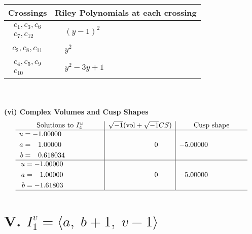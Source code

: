 \documentclass[1p]{elsarticle_modified}
\theoremstyle{definition}
\newcommand{\I}{\sqrt{-1}}
\begin{document}
\begin{tabular}{m{50pt}|m{274pt}}
Crossings & \hspace{64pt}Riley Polynomials at each crossing \\
\hline $$\begin{aligned}c_{1},c_{3},c_{6}\\c_{7},c_{12}\end{aligned}$$&$\begin{aligned}
&(y-1)^2
\end{aligned}$\\
\hline $$\begin{aligned}c_{2},c_{8},c_{11}\end{aligned}$$&$\begin{aligned}
&y^2
\end{aligned}$\\
\hline $$\begin{aligned}c_{4},c_{5},c_{9}\\c_{10}\end{aligned}$$&$\begin{aligned}
&y^2-3 y+1
\end{aligned}$\\
\hline
\end{tabular}\\~\\
\newpage\flushleft \textbf{(vi) Complex Volumes and Cusp Shapes}
$$\begin{array}{c|c|c}  
\text{Solutions to }I^u_{4}& \I (\text{vol} + \sqrt{-1}CS) & \text{Cusp shape}\\
 \hline 
\begin{aligned}
u &= -1.00000\phantom{ +0.000000I} \\
a &= \phantom{-}1.00000\phantom{ +0.000000I} \\
b &= \phantom{-}0.618034\phantom{ +0.000000I}\end{aligned}
 & \phantom{-0.000000 } 0 & -5.00000\phantom{ +0.000000I} \\ \hline\begin{aligned}
u &= -1.00000\phantom{ +0.000000I} \\
a &= \phantom{-}1.00000\phantom{ +0.000000I} \\
b &= -1.61803\phantom{ +0.000000I}\end{aligned}
 & \phantom{-0.000000 } 0 & -5.00000\phantom{ +0.000000I}\\
 \hline 
 \end{array}$$\newpage\newpage\renewcommand{\arraystretch}{1}
\centering \section*{V. $I^v_{1}= \langle a,\;b+1,\;v-1 \rangle$}
\end{document}
